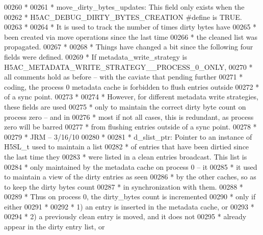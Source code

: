 \begin{DoxyCode}
00260 \textcolor{comment}{ *}
00261 \textcolor{comment}{ * move\_dirty\_bytes\_updates:  This field only exists when the}
00262 \textcolor{comment}{ *              H5AC\_DEBUG\_DIRTY\_BYTES\_CREATION #define is TRUE.}
00263 \textcolor{comment}{ *}
00264 \textcolor{comment}{ *      It is used to track the number of times dirty bytes have}
00265 \textcolor{comment}{ *      been created via move operations since the last time}
00266 \textcolor{comment}{ *      the cleaned list was propagated.}
00267 \textcolor{comment}{ *}
00268 \textcolor{comment}{ * Things have changed a bit since the following four fields were defined.}
00269 \textcolor{comment}{ * If metadata\_write\_strategy is H5AC\_METADATA\_WRITE\_STRATEGY\_\_PROCESS\_0\_ONLY,}
00270 \textcolor{comment}{ * all comments hold as before -- with the caviate that pending further }
00271 \textcolor{comment}{ * coding, the process 0 metadata cache is forbidden to flush entries outside}
00272 \textcolor{comment}{ * of a sync point.}
00273 \textcolor{comment}{ *}
00274 \textcolor{comment}{ * However, for different metadata write strategies, these fields are used}
00275 \textcolor{comment}{ * only to maintain the correct dirty byte count on process zero -- and in}
00276 \textcolor{comment}{ * most if not all cases, this is redundant, as process zero will be barred}
00277 \textcolor{comment}{ * from flushing entries outside of a sync point.}
00278 \textcolor{comment}{ *}
00279 \textcolor{comment}{ *                      JRM -- 3/16/10}
00280 \textcolor{comment}{ *}
00281 \textcolor{comment}{ * d\_slist\_ptr:  Pointer to an instance of H5SL\_t used to maintain a list}
00282 \textcolor{comment}{ *      of entries that have been dirtied since the last time they}
00283 \textcolor{comment}{ *      were listed in a clean entries broadcast.  This list is}
00284 \textcolor{comment}{ *      only maintained by the metadata cache on process 0 -- it}
00285 \textcolor{comment}{ *      it used to maintain a view of the dirty entries as seen}
00286 \textcolor{comment}{ *      by the other caches, so as to keep the dirty bytes count}
00287 \textcolor{comment}{ *      in synchronization with them.}
00288 \textcolor{comment}{ *}
00289 \textcolor{comment}{ *      Thus on process 0, the dirty\_bytes count is incremented}
00290 \textcolor{comment}{ *      only if either}
00291 \textcolor{comment}{ *}
00292 \textcolor{comment}{ *      1) an entry is inserted in the metadata cache, or}
00293 \textcolor{comment}{ *}
00294 \textcolor{comment}{ *      2) a previously clean entry is moved, and it does not}
00295 \textcolor{comment}{ *         already appear in the dirty entry list, or}

\end{DoxyCode}
